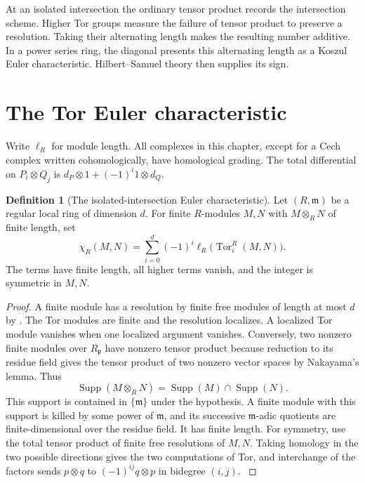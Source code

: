\documentclass[11pt,oneside,openany]{book}
\theoremstyle{definition}
\newtheorem{definition}[theorem]{Definition}
\theoremstyle{remark}
\begin{document}
At an isolated intersection the ordinary tensor product records the
intersection scheme. Higher Tor groups measure the failure of tensor
product to preserve a resolution. Taking their alternating length makes
the resulting number additive. In a power series ring, the diagonal
presents this alternating length as a Koszul Euler characteristic.
Hilbert--Samuel theory then supplies its sign.
\cite[Chapter V]{serre-local}

\section{The Tor Euler characteristic}

Write \(\ell_R\) for module length. All complexes in this chapter, except
for a Cech complex written cohomologically, have homological grading.
The total differential on \(P_i\otimes Q_j\) is
\(d_P\otimes 1+(-1)^i1\otimes d_Q\).

\begin{definition}[The isolated-intersection Euler characteristic]\label{res:I01}
Let \((R,\mathfrak m)\) be a regular local ring of dimension \(d\).
For finite \(R\)-modules \(M,N\) with \(M\otimes_R N\) of finite length, set
\[
 \chi_R(M,N)=\sum_{i=0}^d(-1)^i
                \ell_R\bigl(\operatorname{Tor}_i^R(M,N)\bigr).
\]
The terms have finite length, all higher terms vanish, and the integer is
symmetric in \(M,N\).
\end{definition}
\begin{proof}
A finite module has a resolution by finite free modules of length at
most \(d\) by \cite[CM-12 or CM-19]{core}. The Tor modules are finite
and the resolution localizes. A localized Tor module vanishes when
one localized argument vanishes. Conversely, two nonzero finite
modules over \(R_{\mathfrak p}\) have nonzero tensor product because reduction
to its residue field gives the tensor product of two nonzero vector
spaces by Nakayama's lemma. Thus
\[
 \operatorname{Supp}(M\otimes_R N)
   =\operatorname{Supp}(M)\cap\operatorname{Supp}(N).
\]
This support is contained in \(\{\mathfrak m\}\) under the hypothesis.
A finite module with this support is killed by some power of
\(\mathfrak m\), and its successive \(\mathfrak m\)-adic quotients are
finite-dimensional over the residue field. It has finite length.
For symmetry, use the total tensor product of finite free resolutions
of \(M,N\). Taking homology in the two possible directions gives the
two computations of Tor, and interchange of the factors sends
\(p\otimes q\) to \((-1)^{ij}q\otimes p\) in bidegree \((i,j)\).
\cite[\S2]{dugger}
\end{proof}
\end{document}
